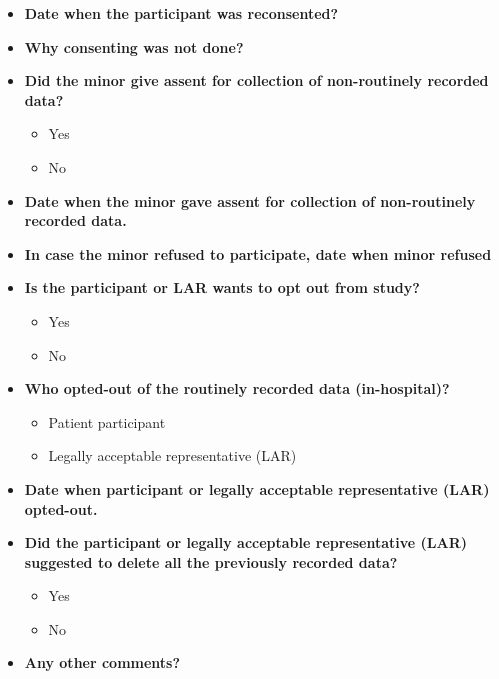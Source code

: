 \documentclass[
]{scrartcl}
\providecommand{\tightlist}{%
  \setlength{\itemsep}{0pt}\setlength{\parskip}{0pt}}\usepackage{longtable,booktabs,array}
\begin{document}
\begin{itemize}
  \begin{itemize}
  \tightlist
  \item
    Yes
  \item
    No
  \end{itemize}
\item
  \textbf{Date when the participant was reconsented?}
\item
  \textbf{Why consenting was not done?}
\item
  \textbf{Did the minor give assent for collection of non-routinely
  recorded data?}

  \begin{itemize}
  \tightlist
  \item
    Yes
  \item
    No
  \end{itemize}
\item
  \textbf{Date when the minor gave assent for collection of
  non-routinely recorded data.}
\item
  \textbf{In case the minor refused to participate, date when minor
  refused}
\item
  \textbf{Is the participant or LAR wants to opt out from study?}

  \begin{itemize}
  \tightlist
  \item
    Yes
  \item
    No
  \end{itemize}
\item
  \textbf{Who opted-out of the routinely recorded data (in-hospital)?}

  \begin{itemize}
  \tightlist
  \item
    Patient participant
  \item
    Legally acceptable representative (LAR)
  \end{itemize}
\item
  \textbf{Date when participant or legally acceptable representative
  (LAR) opted-out.}
\item
  \textbf{Did the participant or legally acceptable representative (LAR)
  suggested to delete all the previously recorded data?}

  \begin{itemize}
  \tightlist
  \item
    Yes
  \item
    No
  \end{itemize}
\item
  \textbf{Any other comments?}
\end{itemize}
\end{document}
